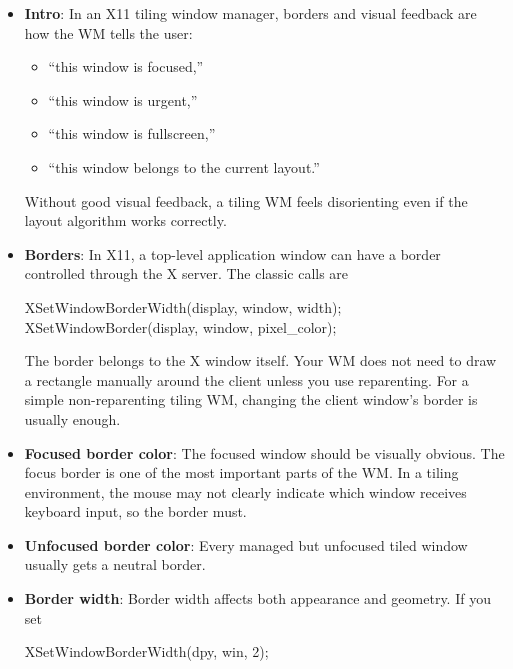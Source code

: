 \documentclass{report}
\begin{document}
    \pagebreak 
    \begin{itemize}
        \item \textbf{Intro}: In an X11 tiling window manager, borders and visual feedback are how the WM tells the user:
            \begin{itemize}
                \item “this window is focused,”
                \item “this window is urgent,”
                \item “this window is fullscreen,”
                \item “this window belongs to the current layout.”
            \end{itemize}
            Without good visual feedback, a tiling WM feels disorienting even if the layout algorithm works correctly.
        \item \textbf{Borders}: In X11, a top-level application window can have a border controlled through the X server.
            \bigbreak \noindent 
            The classic calls are
            \bigbreak \noindent 
            \begin{cppcode}
                XSetWindowBorderWidth(display, window, width);
                XSetWindowBorder(display, window, pixel_color);  
            \end{cppcode}
            \bigbreak \noindent 
            The border belongs to the X window itself. Your WM does not need to draw a rectangle manually around the client unless you use reparenting.
            \bigbreak \noindent 
            For a simple non-reparenting tiling WM, changing the client window’s border is usually enough.
        \item \textbf{Focused border color}: The focused window should be visually obvious. The focus border is one of the most important parts of the WM. In a tiling environment, the mouse may not clearly indicate which window receives keyboard input, so the border must.
        \item \textbf{Unfocused border color}: Every managed but unfocused tiled window usually gets a neutral border.
        \item \textbf{Border width}: Border width affects both appearance and geometry.
            \bigbreak \noindent 
            If you set
            \bigbreak \noindent 
            \begin{cppcode}
            XSetWindowBorderWidth(dpy, win, 2);
            \end{cppcode}

\end{itemize}
\end{document}

